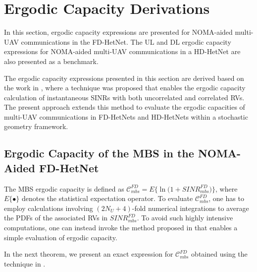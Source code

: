 \section{Ergodic Capacity Derivations} \label{NOMA_aided_multi_UAV_FD_HetNet_sec_erg_cap}

In this section, ergodic capacity expressions are presented for NOMA-aided multi-UAV communications in the FD-HetNet. The UL and DL ergodic capacity expressions for NOMA-aided multi-UAV communications in a HD-HetNet are also presented as a benchmark. 

The ergodic capacity expressions presented in this section are derived based on the work in \cite[Lemma 1]{hamdi2010useful}, where a technique was proposed that enables the ergodic capacity calculation of instantaneous SINRs with both uncorrelated and correlated RVs. The present approach extends this method to evaluate the ergodic capacities of multi-UAV communications in FD-HetNets and HD-HetNets within a stochastic geometry framework.

\subsection{Ergodic Capacity of the MBS in the NOMA-Aided FD-HetNet}

The MBS ergodic capacity is defined as $\mathcal{C}_{mbs}^{FD} = E\Big\{\ln\Big(1+SINR_{mbs}^{FD}\Big)\Big\}$, where $E\{\bullet\}$ denotes the statistical expectation operator. To evaluate $\mathcal{C}_{mbs}^{FD}$, one has to employ calculations involving $(2N_U + 4)$-fold numerical integrations to average the PDFs of the associated RVs in $SINR_{mbs}^{FD}$. To avoid such highly intensive computations, one can instead invoke the method proposed in \cite{hamdi2010useful} that enables a simple evaluation of ergodic capacity. 

In the next theorem, we present an exact expression for $\mathcal{C}_{mbs}^{FD}$ obtained using the technique in \cite{hamdi2010useful}.

